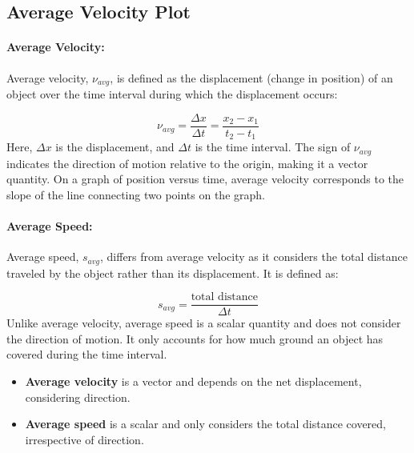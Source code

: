 \documentclass{article}
\begin{document}
\begin{center}
\section*{Average Velocity Plot}
\end{center}

\paragraph{Average Velocity:}
Average velocity, $\nu_{avg}$, is defined as the displacement (change in position) of an object over the time interval during which the displacement occurs:

\[
\nu_{avg} = \frac{\Delta x}{\Delta t} = \frac{x_2 - x_1}{t_2 - t_1}
\]
Here, $\Delta x$ is the displacement, and $\Delta t$ is the time interval. The sign of $\nu_{avg}$ indicates the direction of motion relative to the origin, making it a vector quantity. On a graph of position versus time, average velocity corresponds to the slope of the line connecting two points on the graph.

\paragraph{Average Speed:}
Average speed, $s_{avg}$, differs from average velocity as it considers the total distance traveled by the object rather than its displacement. It is defined as:

\[
s_{avg} = \frac{\text{total distance}}{\Delta t}
\]
Unlike average velocity, average speed is a scalar quantity and does not consider the direction of motion. It only accounts for how much ground an object has covered during the time interval.

\begin{itemize}
    \item \textbf{Average velocity} is a vector and depends on the net displacement, considering direction.
    \item \textbf{Average speed} is a scalar and only considers the total distance covered, irrespective of direction.
\end{itemize}
\end{document}
